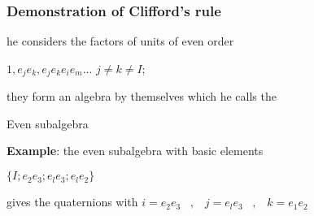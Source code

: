 \begin{frame}\frametitle{Demonstration of Clifford’s rule }


he considers the factors of units of even order

\begin{center}
	$1, e_j e_k, e_j e_k e_i e_m...$  $j \neq k \neq I$;
\end{center}
they form an algebra by themselves which he calls the
\begin{center}
	 {\color{red} Even subalgebra}
\end{center} 

\textbf{Example}: the even subalgebra with basic elements 
\begin{center}
	$\{I; e_2 e_3; e_l e_3; e_l e_2\}$
\end{center}
 gives the quaternions with $i = e_2 e_3\;\;\;,\;\;\; j = e_l e_3\;\;\;, \;\;\;k = e_1 e_2$





\end{frame}
